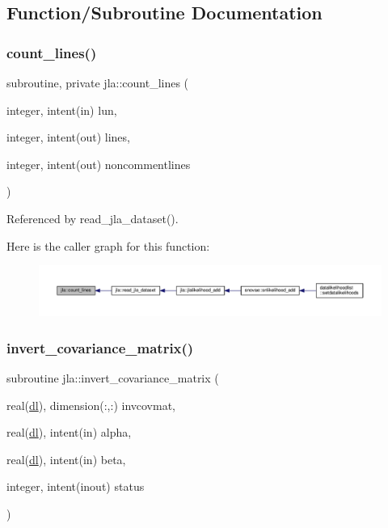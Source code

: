 \subsection{Function/\+Subroutine Documentation}
\mbox{\label{namespacejla_a2b7997e55b705956940cd1729f2a6e93}} 
\subsubsection{\texorpdfstring{count\+\_\+lines()}{count\_lines()}}
{\footnotesize\ttfamily subroutine, private jla\+::count\+\_\+lines (\begin{DoxyParamCaption}\item[{integer, intent(in)}]{lun,  }\item[{integer, intent(out)}]{lines,  }\item[{integer, intent(out)}]{noncommentlines }\end{DoxyParamCaption})\hspace{0.3cm}{\ttfamily [private]}}



Referenced by read\+\_\+jla\+\_\+dataset().

Here is the caller graph for this function\+:
\nopagebreak
\begin{figure}[H]
\begin{center}
\leavevmode
\includegraphics[width=350pt]{namespacejla_a2b7997e55b705956940cd1729f2a6e93_icgraph}
\end{center}
\end{figure}
\mbox{\label{namespacejla_a212c8dceda3061fd0e44c6a2834a4196}} 
\subsubsection{\texorpdfstring{invert\+\_\+covariance\+\_\+matrix()}{invert\_covariance\_matrix()}}
{\footnotesize\ttfamily subroutine jla\+::invert\+\_\+covariance\+\_\+matrix (\begin{DoxyParamCaption}\item[{real(\mbox{\hyperlink{namespacejla_a3aa6435b4e08f1d532390186ac608741}{dl}}), dimension(\+:,\+:)}]{invcovmat,  }\item[{real(\mbox{\hyperlink{namespacejla_a3aa6435b4e08f1d532390186ac608741}{dl}}), intent(in)}]{alpha,  }\item[{real(\mbox{\hyperlink{namespacejla_a3aa6435b4e08f1d532390186ac608741}{dl}}), intent(in)}]{beta,  }\item[{integer, intent(inout)}]{status }\end{DoxyParamCaption})}




